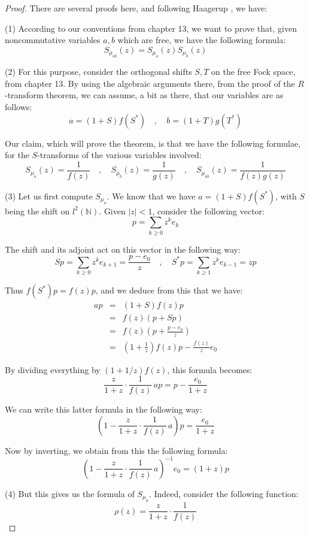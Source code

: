 \documentclass[12pt]{amsbook}
\begin{document}
\begin{proof}
There are several proofs here, and following Haagerup \cite{haa}, we have:

\medskip

(1) According to our conventions from chapter 13, we want to prove that, given noncommutative variables $a,b$ which are free, we have the following formula:
$$S_{\mu_{ab}}(z)=S_{\mu_a}(z)S_{\mu_b}(z)$$

(2) For this purpose, consider the orthogonal shifts $S,T$ on the free Fock space, from chapter 13. By using the algebraic arguments there, from the proof of the $R$-transform theorem, we can assume, a bit as there, that our variables are as follows:
$$a=(1+S)f(S^*)\quad,\quad 
b=(1+T)g(T^*)$$

Our claim, which will prove the theorem, is that we have the following formulae, for the $S$-transforms of the various variables involved:
$$S_{\mu_a}(z)=\frac{1}{f(z)}\quad,\quad 
S_{\mu_b}(z)=\frac{1}{g(z)}\quad,\quad 
S_{\mu_{ab}}(z)=\frac{1}{f(z)g(z)}$$

(3) Let us first compute $S_{\mu_a}$. We know that we have $a=(1+S)f(S^*)$, with $S$ being the shift on $l^2(\mathbb N)$. Given $|z|<1$, consider the following vector:
$$p=\sum_{k\geq0}z^ke_k$$ 

The shift and its adjoint act on this vector in the following way:
$$Sp=\sum_{k\geq0}z^ke_{k+1}=\frac{p-e_0}{z}\quad,\quad 
S^*p=\sum_{k\geq1}z^ke_{k-1}=zp$$

Thus $f(S^*)p=f(z)p$, and we deduce from this that we have:
\begin{eqnarray*}
ap
&=&(1+S)f(z)p\\
&=&f(z)(p+Sp)\\
&=&f(z)\left(p+\frac{p-e_0}{z}\right)\\
&=&\left(1+\frac{1}{z}\right)f(z)p-\frac{f(z)}{z}e_0
\end{eqnarray*}

By dividing everything by $(1+1/z)f(z)$, this formula becomes:
$$\frac{z}{1+z}\cdot\frac{1}{f(z)}\,ap=p-\frac{e_0}{1+z}$$

We can write this latter formula in the following way:
$$\left(1-\frac{z}{1+z}\cdot\frac{1}{f(z)}\,a\right)p=\frac{e_0}{1+z}$$

Now by inverting, we obtain from this the following formula:
$$\left(1-\frac{z}{1+z}\cdot\frac{1}{f(z)}\,a\right)^{-1}e_0=(1+z)p$$

(4) But this gives us the formula of $S_{\mu_a}$. Indeed, consider the following function:
$$\rho(z)=\frac{z}{1+z}\cdot\frac{1}{f(z)}$$


\end{proof}
\end{document}
